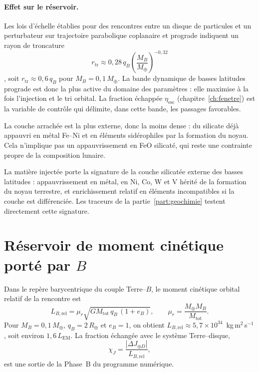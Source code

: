 \documentclass[11pt,a4paper,openany]{report}
\newcommand{\Mt}{M_{\oplus}}
\newcommand{\Rt}{R_{\oplus}}
\newcommand{\Mtot}{M_{\mathrm{tot}}}
\begin{document}
\paragraph{Effet sur le réservoir.}
Les lois d'échelle établies pour des rencontres entre un disque de particules et un perturbateur
sur trajectoire parabolique coplanaire et prograde indiquent un rayon de troncature
\begin{equation}
r_{\mathrm{tr}}\approx0{,}28\,q_B\left(\frac{M_B}{\Mt}\right)^{-0{,}32}
\label{eq:troncature}
\end{equation}
\cite{Breslau2014}, soit $r_{\mathrm{tr}}\approx0{,}6\,q_B$ pour $M_B=0{,}1\,\Mt$. La bande dynamique de basses latitudes prograde est donc la plus active du domaine des paramètres : elle maximise à la
fois l'injection et le tri orbital. La fraction échappée $\eta_{\mathrm{esc}}$
(chapitre~\ref{ch:fenetre}) est la variable de contrôle qui délimite, dans cette bande, les
passages favorables.

\begin{ideephys}
La couche arrachée est la plus externe, donc la moins dense : du silicate déjà appauvri en
métal Fe--Ni et en éléments sidérophiles par la formation du noyau. Cela n'implique pas un
appauvrissement en FeO silicaté, qui reste une contrainte propre de la composition lunaire.
\end{ideephys}

\begin{consequence}
La matière injectée porte la signature de la couche silicatée externe des basses latitudes :
appauvrissement en métal, en Ni, Co, W et V hérité de la formation du noyau terrestre, et
enrichissement relatif en éléments incompatibles si la couche est différenciée. Les traceurs de la
partie~\ref{part:geochimie} testent directement cette signature.
\end{consequence}

\section{Réservoir de moment cinétique porté par \texorpdfstring{$B$}{B}}

Dans le repère barycentrique du couple Terre--$B$, le moment cinétique orbital relatif de la
rencontre est
\begin{equation}
L_{B,\mathrm{rel}}=\mu_r\sqrt{G\Mtot\,q_B\,(1+e_B)},
\qquad \mu_r=\frac{\Mt M_B}{\Mtot}.
\label{eq:LBrel}
\end{equation}
Pour $M_B=0{,}1\,\Mt$, $q_B=2\,\Rt$ et $e_B=1$, on obtient
$L_{B,\mathrm{rel}}\approx5{,}7\times10^{34}$~kg\,m$^2$\,s$^{-1}$, soit environ $1{,}6\,L_{\mathrm{EM}}$.
La fraction échangée avec le système Terre--disque,
\begin{equation}
\chi_J=\frac{|\Delta J_{\oplus D}|}{L_{B,\mathrm{rel}}},
\label{eq:chiJ}
\end{equation}
est une sortie de la Phase~B du programme numérique.
\end{document}
